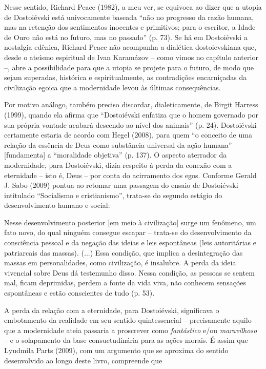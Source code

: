 Nesse sentido, Richard Peace (1982), a meu ver, se equivoca ao dizer que
a utopia de Dostoiévski está univocamente baseada ``não no progresso da
razão humana, mas na retenção dos sentimentos inocentes e primitivos;
para o escritor, a Idade de Ouro não está no futuro, mas no passado''
(p. 73). Se há em Dostoiévski a nostalgia edênica, Richard Peace não
acompanha a dialética dostoievskiana que, desde o ateísmo espiritual de
Ivan Karamázov -- como vimos no capítulo anterior --, abre a
possibilidade para que a utopia se projete para o futuro, de modo que
sejam superadas, histórica e espiritualmente, as contradições
encarniçadas da civilização egoica que a modernidade levou às últimas
consequências.

Por motivo análogo, também preciso discordar, dialeticamente, de Birgit
Harress (1999), quando ela afirma que ``Dostoiévski enfatiza que o homem
governado por sua própria vontade acabará descendo ao nível dos
animais'' (p. 24). Dostoiévski certamente estaria de acordo com Hegel
(2008), para quem ``o conceito de uma relação da essência de Deus como
substância universal da ação humana'' {[}fundamenta{]} a ``moralidade
objetiva'' (p. 137). O aspecto aterrador da modernidade, para
Dostoiévski, dizia respeito à perda da conexão com a eternidade -- isto
é, Deus -- por conta do acirramento dos egos. Conforme Gerald J. Sabo
(2009) pontua ao retomar uma passagem do ensaio de Dostoiévski
intitulado ``Socialismo e cristianismo'', trata-se do segundo estágio do
desenvolvimento humano e social:

Nesse desenvolvimento posterior {[}em meio à civilização{]} surge um
fenômeno, um fato novo, do qual ninguém consegue escapar -- trata-se do
desenvolvimento da consciência pessoal e da negação das ideias e leis
espontâneas (leis autoritárias e patriarcais das massas). (...) Essa
condição, que implica a desintegração das massas em personalidades, como
civilização, é insalubre. A perda da ideia vivencial sobre Deus dá
testemunho disso. Nessa condição, as pessoas se sentem mal, ficam
deprimidas, perdem a fonte da vida viva, não conhecem sensações
espontâneas e estão conscientes de tudo (p. 53).

A perda da relação com a eternidade, para Dostoiévski, significava o
embotamento da realidade em seu sentido quintessencial -- precisamente
aquilo que a modernidade ateia passaria a proscrever como
\emph{fantástico} e/ou \emph{maravilhoso} -- e o solapamento da base
consuetudinária para as ações morais. É assim que Lyudmila Parts (2009),
com um argumento que se aproxima do sentido desenvolvido ao longo deste
livro, compreende que

